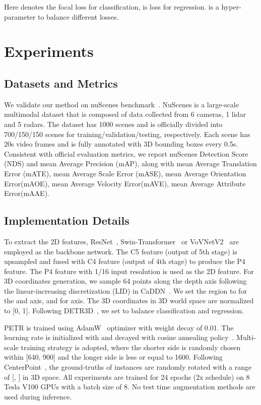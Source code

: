 \documentclass[runningheads]{llncs}
\begin{document}
Here  denotes the focal loss for classification,  is  loss for regression.  is a hyper-parameter to balance different losses.

\section{Experiments}
\subsection{Datasets and Metrics}
We validate our method on nuScenes benchmark~\cite{caesar2020nuscenes}. NuScenes is a large-scale multimodal dataset that is composed of data collected from 6 cameras, 1 lidar and 5 radars. The dataset has 1000 scenes and is officially divided into 700/150/150 scenes for training/validation/testing, respectively. Each scene has 20s video frames and is fully annotated with 3D bounding boxes every 0.5s. Consistent with official evaluation metrics, we report nuScenes Detection Score (NDS) and mean Average Precision (mAP), along with mean Average Translation Error (mATE), mean Average Scale Error (mASE), mean Average Orientation Error(mAOE), mean Average
Velocity Error(mAVE), mean Average Attribute Error(mAAE). 

\subsection{Implementation Details}
To extract the 2D features, ResNet~\cite{he2016resnet}, Swin-Transformer~\cite{liu2021swin} or VoVNetV2~\cite{lee2020centermask} are employed as the backbone network. The C5 feature (output of 5th stage) is upsampled and fused with C4 feature (output of 4th stage) to produce the P4 feature. The P4 feature with 1/16 input resolution is used as the 2D feature.
For 3D coordinates generation, we sample 64 points along the depth axis following the linear-increasing discretization (LID) in CaDDN~\cite{reading2021categorical}. We set the region to  for the  and  axis, and  for  axis. The 3D coordinates in 3D world space are normalized to [0, 1]. Following DETR3D~\cite{wang2022detr3d}, we set  to balance classification and regression.

PETR is trained using AdamW~\cite{loshchilov2017decoupled} optimizer with weight decay of 0.01. The learning rate is initialized with  and decayed with cosine annealing policy~\cite{loshchilov2016sgdr}. Multi-scale training strategy is adopted, where the shorter side is randomly chosen within [640, 900] and the longer side is less or equal to 1600. Following CenterPoint~\cite{yin2021center}, the ground-truths of instances are randomly rotated with a range of [, ] in 3D space.  All experiments are trained for 24 epochs (2x schedule) on 8 Tesla V100 GPUs with a batch size of 8. No test time augmentation methods are used during inference.
\end{document}
